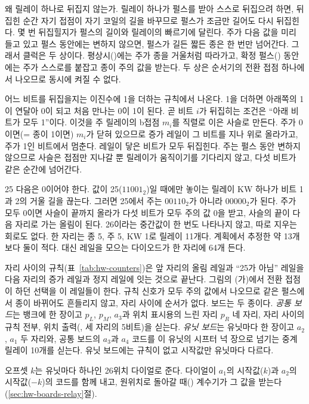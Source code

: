 왜 릴레이 하나로 뒤집지 않는가. 릴레이 하나가 펄스를 받아 스스로 뒤집으려 하면, 뒤집힌 순간 자기 접점이 자기 코일의
길을 바꾸므로 펄스가 조금만 길어도 다시 뒤집힌다. 몇 번 뒤집힐지가 펄스의 길이와 릴레이의 빠르기에 달린다. 주가
다음 값을 미리 들고 있고 펄스 동안에는 변하지 않으면, 펄스가 길든 짧든 종은 한 번만 넘어간다. 그래서 클럭은 두
상이다. 평상시()에는 주가 종을 거울처럼 따라가고, 확정 펄스() 동안에는 주가 스스로를 붙잡고 종이
주의 값을 받는다. 두 상은 순서기의 전환 접점 하나에서 나오므로 동시에 켜질 수 없다.

어느 비트를 뒤집을지는 이진수에 1을 더하는 규칙에서 나온다. 1을 더하면 아래쪽의 1이 연달아 0이 되고 처음 만나는
0이 1이 된다. 곧 비트 $i$가 뒤집히는 조건은 ``아래 비트가 모두 1''이다. 이것을 주 릴레이의 b접점 $m_i$를 직렬로
이은 사슬로 만든다. 주가 0이면(= 종이 1이면) $m_i$가 닫혀 있으므로 증가 레일이 그 비트를 지나 위로 올라가고, 주가
1인 비트에서 멈춘다. 레일이 닿은 비트가 모두 뒤집힌다. 주는 펄스 동안 변하지 않으므로 사슬은 접점만 지나갈 뿐
릴레이가 움직이기를 기다리지 않고, 다섯 비트가 같은 순간에 넘어간다.

25 다음은 0이어야 한다. 값이 25($11001_2$)일 때에만 놓이는 릴레이 KW 하나가 비트 1과 2의 거울 길을 끊는다. 그러면
25에서 주는 $00110_2$가 아니라 $00000_2$가 된다. 주가 모두 0이면 사슬이 끝까지 올라가 다섯 비트가 모두 주의 값 0을
받고, 사슬의 끝이 다음 자리로 가는 올림이 된다. 26이라는 중간값이 한 번도 나타나지 않고, 따로 지우는 회로도 없다.
한 자리는 종 5, 주 5, KW 1로 릴레이 11개다. 계획에서 추정한 약 13개보다 둘이 적다. 대신 레일을 모으는 다이오드가
한 자리에 64개 든다.

자리 사이의 규칙(표~\ref{tab:hw-counters})은 앞 자리의 올림 레일과 ``25가 아님'' 레일을 다음 자리의 증가 레일과
정지 레일에 잇는 것으로 끝난다. 그림의 (가)에서 전환 접점이 하던 선택을 이 레일들이 한다. 규칙 신호가 모두 주의
값에서 나오므로 같은 펄스에서 종이 바뀌어도 흔들리지 않고, 자리 사이에 순서가 없다. 보드는 두 종이다. \emph{공통
보드}는 뱅크에 한 장이고 $p_L$, $p_M$, $a_3$과 위치 표시용의 느린 자리 $p_R$ 네 자리, 자리 사이의 규칙 전부, 위치
출력(, 세 자리의 5비트)을 싣는다. \emph{유닛 보드}는 유닛마다 한 장이고 $a_2$, $a_1$ 두 자리와, 공통 보드의
$a_3$과 $a_4$ 코드를 이 유닛의 시프터 넉 장으로 넘기는 중계 릴레이 10개를 싣는다. 유닛 보드에는 규칙이 없고 시작값만
유닛마다 다르다.

오프셋 $k$는 유닛마다 하나인 26위치 다이얼로 준다. 다이얼이 $a_1$의 시작값($k$)과 $a_2$의 시작값($-k$)의 코드를 함께
내고, 원위치로 돌아갈 때() 계수기가 그 값을 받는다(\ref{sec:hw-boards-relay}절).

